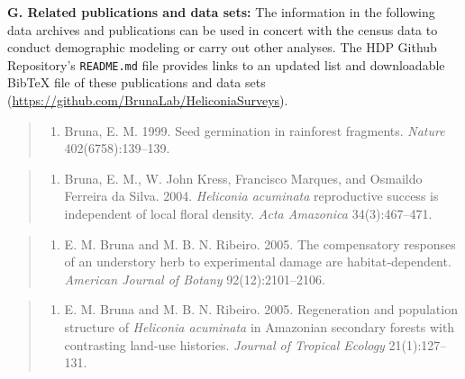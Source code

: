 \documentclass[
  man, donotrepeattitle,floatsintext]{apa6}
\providecommand{\tightlist}{%
  \setlength{\itemsep}{0pt}\setlength{\parskip}{0pt}}
\begin{document}
\noindent  
\textbf{G. Related publications and data sets:} The information in the following data archives and publications can be used in concert with the census data to conduct demographic modeling or carry out other analyses. The HDP Github Repository's \texttt{README.md} file provides links to an updated list and downloadable BibTeX file of these publications and data sets (\url{https://github.com/BrunaLab/HeliconiaSurveys}).

\begin{quote}
\begin{enumerate}
\def\labelenumi{\arabic{enumi}.}
\tightlist
\item
  Bruna, E. M. 1999. Seed germination in rainforest fragments. \emph{Nature} 402(6758):139--139.
\end{enumerate}
\end{quote}

\begin{quote}
\begin{enumerate}
\def\labelenumi{\arabic{enumi}.}
\setcounter{enumi}{1}
\tightlist
\item
  Bruna, E. M., W. John Kress, Francisco Marques, and Osmaildo Ferreira da Silva. 2004. \emph{Heliconia acuminata} reproductive success is independent of local floral density. \emph{Acta Amazonica} 34(3):467--471.
\end{enumerate}
\end{quote}

\begin{quote}
\begin{enumerate}
\def\labelenumi{\arabic{enumi}.}
\setcounter{enumi}{2}
\tightlist
\item
  E. M. Bruna and M. B. N. Ribeiro. 2005. The compensatory responses of an understory herb to experimental damage are habitat‐dependent. \emph{American Journal of Botany} 92(12):2101--2106.
\end{enumerate}
\end{quote}

\begin{quote}
\begin{enumerate}
\def\labelenumi{\arabic{enumi}.}
\setcounter{enumi}{3}
\tightlist
\item
  E. M. Bruna and M. B. N. Ribeiro. 2005. Regeneration and population structure of \emph{Heliconia acuminata} in Amazonian secondary forests with contrasting land-use histories. \emph{Journal of Tropical Ecology} 21(1):127--131.
\end{enumerate}
\end{quote}
\end{document}
